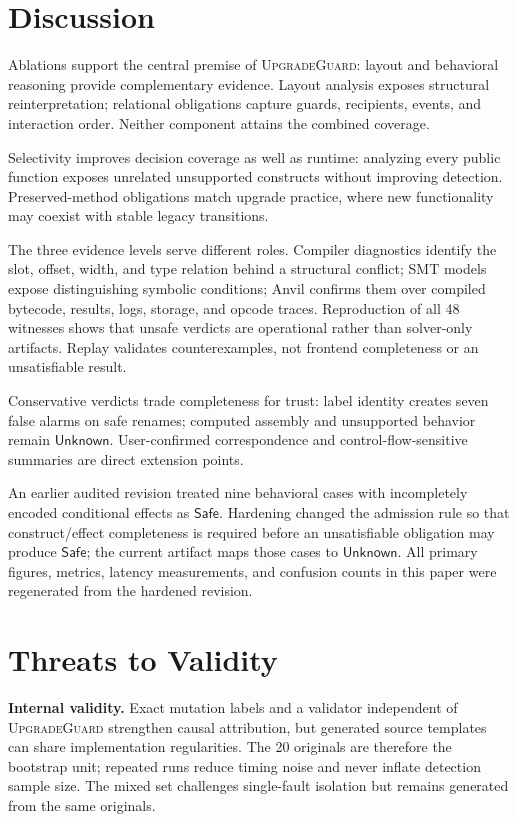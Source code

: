 \documentclass[runningheads]{llncs}
\newcommand{\tool}{\textsc{UpgradeGuard}\xspace}
\newcommand{\Safe}{\mathsf{Safe}}
\newcommand{\Unknown}{\mathsf{Unknown}}
\begin{document}
\section{Discussion}
\label{sec:discussion}

Ablations support the central premise of \tool: layout and behavioral reasoning provide complementary evidence. Layout analysis exposes structural reinterpretation; relational obligations capture guards, recipients, events, and interaction order. Neither component attains the combined coverage.

Selectivity improves decision coverage as well as runtime: analyzing every public function exposes unrelated unsupported constructs without improving detection. Preserved-method obligations match upgrade practice, where new functionality may coexist with stable legacy transitions.

The three evidence levels serve different roles. Compiler diagnostics identify the slot, offset, width, and type relation behind a structural conflict; SMT models expose distinguishing symbolic conditions; Anvil confirms them over compiled bytecode, results, logs, storage, and opcode traces. Reproduction of all 48 witnesses shows that unsafe verdicts are operational rather than solver-only artifacts. Replay validates counterexamples, not frontend completeness or an unsatisfiable result.

Conservative verdicts trade completeness for trust: label identity creates seven false alarms on safe renames; computed assembly and unsupported behavior remain \(\Unknown\). User-confirmed correspondence and control-flow-sensitive summaries are direct extension points.

An earlier audited revision treated nine behavioral cases with incompletely encoded conditional effects as \(\Safe\). Hardening changed the admission rule so that construct/effect completeness is required before an unsatisfiable obligation may produce \(\Safe\); the current artifact maps those cases to \(\Unknown\). All primary figures, metrics, latency measurements, and confusion counts in this paper were regenerated from the hardened revision.

\section{Threats to Validity}
\label{sec:threats}

\textbf{Internal validity.} Exact mutation labels and a validator independent of \tool strengthen causal attribution, but generated source templates can share implementation regularities. The 20 originals are therefore the bootstrap unit; repeated runs reduce timing noise and never inflate detection sample size. The mixed set challenges single-fault isolation but remains generated from the same originals.
\end{document}
